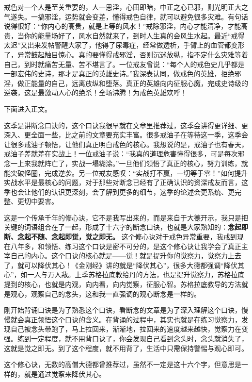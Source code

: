 \begin{case}
    戒色对一个人是至关重要的，人一思淫，心田即暗，中正之心已邪，则光明正大之气遂失。一搞邪淫，运势就会变差，懂得戒色自律，就可以避免很多灾难。有句话说得很好：“你内心的高贵，就是上等的风水！”戒除邪淫，内心才能清净，才能高贵，当你的能量场好了，风水自然就来了，到时人生真的会风生水起。最近“戒得太迟”又出来发帖警醒大家了，他得了尿毒症，经常做透析，手臂上的血管都变形了，异常鼓起触目惊心。真的要懂得戒邪淫，否则沉迷放纵，指不定什么灾难等着自己，到时就痛苦无量、苦不堪言了。一位戒友曾说：“每个人的戒色史几乎都是一部宏伟的史诗，那才是真正的英雄史诗。”我深表认同，做戒色的英雄，拒绝邪淫，做正能量的自己，远离放纵和堕落。真正的英雄向内征服心魔，完成史诗级的逆袭，这是最激动人心的绝杀！全场沸腾！为戒色英雄欢呼！
\end{case}

下面进入正文。

这季是讲断念口诀的，这个口诀我很早就在文章里推荐过，这季会讲得更详细、更深入、更全面一些，比之前的文章要充实丰富。很多戒油子在等待这一季，这季会让很多戒油子顿悟，让他们真正明白戒色的核心。我想说的是，戒油子也有春天，戒油子差就差在实战上！一位戒油子说：“我真的道理危害懂得很多，可是每次邪念一上来我就阵亡了，实战一塌糊涂。”一旦他们领悟了真正的核心，努力训练，就能突破怪圈，完成逆袭。另一位戒友感叹：“实战打不赢，一切等于零！”如何提升实战水平是最核心的问题，对于那些对断念已经有了正确认识的资深戒友而言，这季也会让他们的认识更深刻，会了解到更多的细节，这季的论述会更系统、更完整、更切中要害。

这是一个传承千年的修心诀，它不是我写出来的，而是来自于大德开示，我只是把关键的词语组合在了一起，形成了十六字的断念口诀，也就是大家熟知的：\textbf{念起即断、念起不随、念起即觉，觉之即无。} 这个修心诀对于戒色异常重要，我戒到现在八年多，和领悟、练习这个口诀是密不可分的，是这个修心诀让我学会了真正主宰自己的内心。这个口诀的核心就是——觉！就是提升你的觉察力，觉察力上去了，就可以降伏其心！《金刚经》讲的就是“降伏其心”，很多大德都强调“降伏其心”，如一人与万人敌。上季苏格拉底教给丹的方法，也是提升觉察力，苏格拉底提到的核心，也就是内观，向内看，向内觉察，征服心智。苏格拉底教导的方法就是观心，观察自己的念头，这和我一直强调的观心断念是一样的。

刚开始背诵口诀是为了熟悉这个口诀，看断念的文章是为了深入理解这个口诀，慢慢就会真正领悟这个口诀的含义。在背诵的过程中，其实也就是在练习觉察力，发现自己被念头带跑了，马上拉回来，渐渐地，拉回来的速度越来越快，觉察力在变强。练到一定程度，就不用背口诀了，你会发现自己看到念头时，念头就消失了，这就是觉之即无。到了这个程度，就不用背了，生活中只需保持警惕与观心即可。

这个修心诀，无数的高僧大德都曾推荐过，虽然不一定是这十六个字，但意思是一样的，就是通过觉察来降伏其心。

